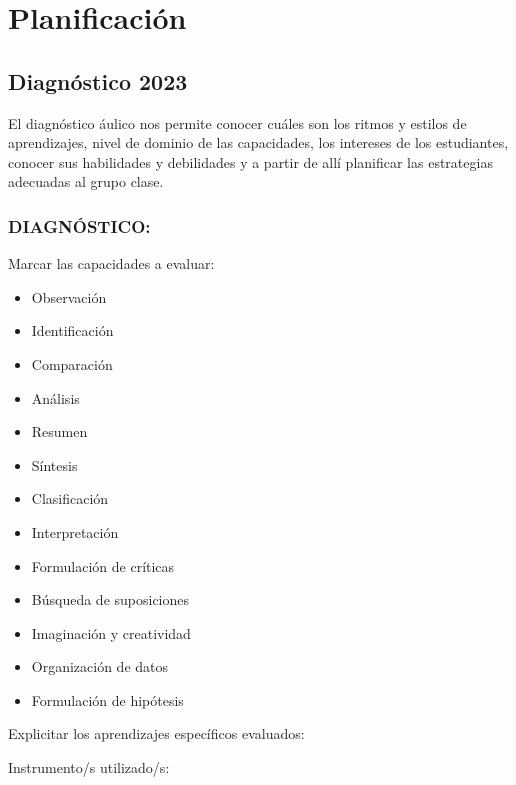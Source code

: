 \documentclass[../main]{subfiles}
\begin{document}
\chapter*{Planificación \materia}
\section{Diagnóstico 2023}
El diagnóstico áulico nos permite conocer cuáles son los ritmos y estilos de aprendizajes, nivel de dominio de las capacidades, los intereses de los estudiantes, conocer sus habilidades y debilidades y a partir de allí planificar las estrategias adecuadas al grupo clase. 

\subsection{DIAGNÓSTICO:} 

Marcar las capacidades a evaluar:  


\begin{itemize}
  \item[$\square$] Observación 
  \item[$\square$] Identificación 
  \item[$\square$] Comparación   
  \item[$\square$] Análisis
  \item[$\square$] Resumen
  \item[$\square$] Síntesis
  \item[$\square$] Clasificación
  \item[$\square$] Interpretación
  \item[$\square$] Formulación de críticas
  \item[$\square$] Búsqueda de suposiciones
  \item[$\square$] Imaginación y creatividad 
  \item[$\square$] Organización de datos  
  \item[$\square$] Formulación de hipótesis  
\end{itemize}
  

 

Explicitar los aprendizajes específicos evaluados: 

 

Instrumento/s utilizado/s:  
\end{document}
